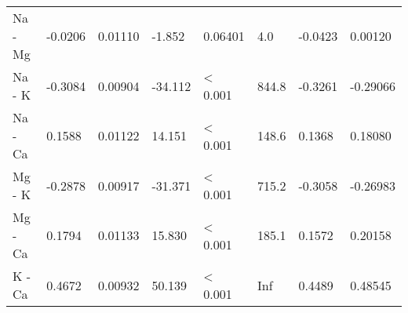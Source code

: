\begin{tabular}[t]{llllllll}
Na - Mg & -0.0206 & 0.01110 & -1.852 & 0.06401 & 4.0 & -0.0423 & 0.00120\\
Na - K & -0.3084 & 0.00904 & -34.112 & < 0.001 & 844.8 & -0.3261 & -0.29066\\
Na - Ca & 0.1588 & 0.01122 & 14.151 & < 0.001 & 148.6 & 0.1368 & 0.18080\\
Mg - K & -0.2878 & 0.00917 & -31.371 & < 0.001 & 715.2 & -0.3058 & -0.26983\\
Mg - Ca & 0.1794 & 0.01133 & 15.830 & < 0.001 & 185.1 & 0.1572 & 0.20158\\
K - Ca & 0.4672 & 0.00932 & 50.139 & < 0.001 & Inf & 0.4489 & 0.48545\\
\bottomrule
\end{tabular}
